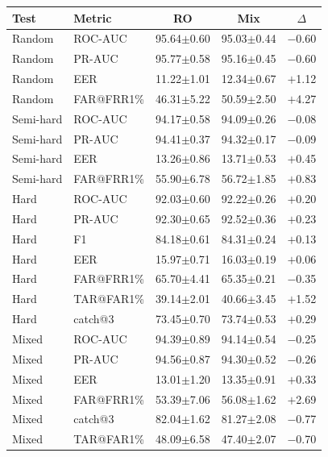 \documentclass[11pt]{article}
\begin{document}
\begin{table}[!t]
\vspace{0.6em}

\begin{minipage}[t]{0.48\textwidth}
\centering
\begin{tabular}{l l c c c}
\toprule
\textbf{Test} & \textbf{Metric} & \textbf{RO} & \textbf{Mix} & \textbf{$\Delta$} \\
\midrule
Random    & ROC-AUC    & 95.64$\pm$0.60 & 95.03$\pm$0.44 & $-$0.60 \\
Random    & PR-AUC     & 95.77$\pm$0.58 & 95.16$\pm$0.45 & $-$0.60 \\
Random    & EER        & 11.22$\pm$1.01 & 12.34$\pm$0.67 & $+$1.12 \\
Random    & FAR@FRR1\% & 46.31$\pm$5.22 & 50.59$\pm$2.50 & $+$4.27 \\
\midrule
Semi-hard & ROC-AUC    & 94.17$\pm$0.58 & 94.09$\pm$0.26 & $-$0.08 \\
Semi-hard & PR-AUC     & 94.41$\pm$0.37 & 94.32$\pm$0.17 & $-$0.09 \\
Semi-hard & EER        & 13.26$\pm$0.86 & 13.71$\pm$0.53 & $+$0.45 \\
Semi-hard & FAR@FRR1\% & 55.90$\pm$6.78 & 56.72$\pm$1.85 & $+$0.83 \\
\midrule
Hard      & ROC-AUC    & 92.03$\pm$0.60 & 92.22$\pm$0.26 & $+$0.20 \\
Hard      & PR-AUC     & 92.30$\pm$0.65 & 92.52$\pm$0.36 & $+$0.23 \\
Hard      & F1         & 84.18$\pm$0.61 & 84.31$\pm$0.24 & $+$0.13 \\
Hard      & EER        & 15.97$\pm$0.71 & 16.03$\pm$0.19 & $+$0.06 \\
Hard      & FAR@FRR1\% & 65.70$\pm$4.41 & 65.35$\pm$0.21 & $-$0.35 \\
Hard      & TAR@FAR1\% & 39.14$\pm$2.01 & 40.66$\pm$3.45 & $+$1.52 \\
Hard      & catch@3    & 73.45$\pm$0.70 & 73.74$\pm$0.53 & $+$0.29 \\
\midrule
Mixed     & ROC-AUC    & 94.39$\pm$0.89 & 94.14$\pm$0.54 & $-$0.25 \\
Mixed     & PR-AUC     & 94.56$\pm$0.87 & 94.30$\pm$0.52 & $-$0.26 \\
Mixed     & EER        & 13.01$\pm$1.20 & 13.35$\pm$0.91 & $+$0.33 \\
Mixed     & FAR@FRR1\% & 53.39$\pm$7.06 & 56.08$\pm$1.62 & $+$2.69 \\
Mixed     & catch@3    & 82.04$\pm$1.62 & 81.27$\pm$2.08 & $-$0.77 \\
Mixed     & TAR@FAR1\% & 48.09$\pm$6.58 & 47.40$\pm$2.07 & $-$0.70 \\
\bottomrule
\end{tabular}
\label{tab:app_pan_minilm}
\end{minipage}%
\hfill
\begin{minipage}[t]{0.48\textwidth}
\centering


\end{minipage}
\end{table}
\end{document}
